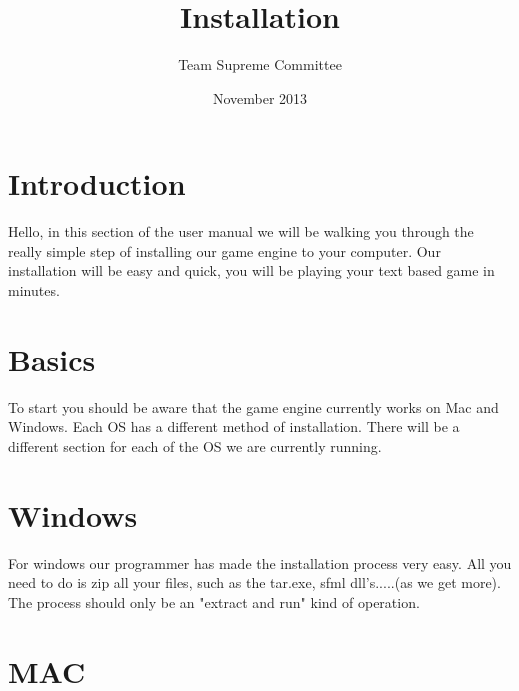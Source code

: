 \documentclass[11pt]{article}
\begin{document}
\title{Installation}
\author{Team Supreme Committee}
\date{November 2013}
\maketitle


\section{Introduction}

Hello, in this section of the user manual we will be walking you through the really simple step of installing our game engine to your computer. Our installation will be easy and quick, you will be playing your text based game in minutes.

\section{Basics}

To start you should be aware that the game engine currently works on Mac and Windows. Each OS has a different method of installation. There will be a different section for each of the OS we are currently running.

\section{Windows}

For windows our programmer has made the installation process very easy. All you need to do is zip all your files, such as the tar.exe, sfml dll's.....(as we get more). The process should only be an "extract and run" kind of operation.

\section{MAC}
\end{document}
